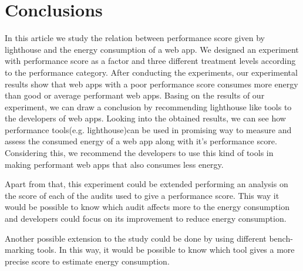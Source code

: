 \section{Conclusions}\label{sec:conclusions}

In this article we study the relation between performance score given by lighthouse and the energy consumption of a web app. We designed an experiment with performance score as a factor and three different treatment levels according to the performance category. After conducting the experiments, our experimental results show that web apps with a poor performance score consumes more energy than good or average performant web apps. Basing on the results of our experiment, we can draw a conclusion by recommending lighthouse like tools to the developers of web apps. Looking into the obtained results, we can see how performance tools(e.g. lighthouse)can be used in promising way to measure and assess the consumed energy of a web app along with it's performance score. Considering this, we recommend the developers to use this kind of tools in making performant web apps that also consumes less energy.\newline

Apart from that, this experiment could be extended performing an analysis on the score of each of the audits used to give a performance score. This way it would be possible to know which audit affects more to the energy consumption and developers could focus on its improvement to reduce energy consumption. \newline

Another possible extension to the study could be done by using different bench-marking tools. In this way, it would be possible to know which tool gives a more precise score to estimate energy consumption.
